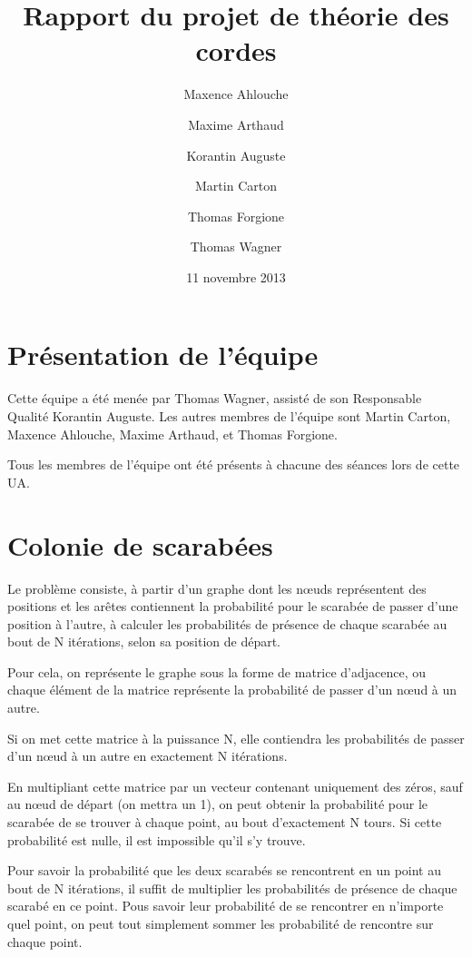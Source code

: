 \documentclass{scrartcl}
\begin{document}
\title{Rapport du projet de théorie des cordes}
\author{Maxence Ahlouche \and Maxime Arthaud \and Korantin Auguste
          \and Martin Carton \and Thomas Forgione \and Thomas Wagner}
\date{11 novembre 2013}
\maketitle
\tableofcontents
\newpage

\section{Présentation de l'équipe}
  Cette équipe a été menée par Thomas Wagner, assisté de son Responsable
  Qualité Korantin Auguste. Les autres membres de l'équipe sont Martin Carton,
  Maxence Ahlouche, Maxime Arthaud, et Thomas Forgione.

  Tous les membres de l'équipe ont été présents à chacune des séances lors de
  cette UA.

\section{Colonie de scarabées}

  Le problème consiste,  à partir d'un graphe dont les nœuds représentent des
  positions et les arêtes contiennent la probabilité pour le scarabée de passer
  d'une position à l'autre, à calculer les probabilités de présence de chaque scarabée
  au bout de N itérations, selon sa position de départ.

  Pour cela, on représente le graphe sous la forme de matrice d'adjacence, ou chaque
  élément de la matrice représente la probabilité de passer d'un nœud à un autre.

  Si on met cette matrice à la puissance N, elle contiendra les probabilités de passer
  d'un nœud à un autre en exactement N itérations.

  En multipliant cette matrice par un vecteur contenant uniquement des zéros, sauf au nœud
  de départ (on mettra un 1), on peut obtenir la probabilité pour le scarabée de se trouver
  à chaque point, au bout d'exactement N tours.
  Si cette probabilité est nulle, il est impossible qu'il s'y trouve.

  Pour savoir la probabilité que les deux scarabés se rencontrent en un point au bout de N itérations,
  il suffit de multiplier les probabilités de présence de chaque scarabé en ce point.
  Pous savoir leur probabilité de se rencontrer en n'importe quel point, on peut tout simplement sommer
  les probabilité de rencontre sur chaque point.
\end{document}
